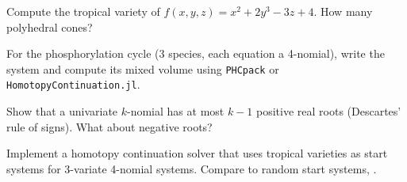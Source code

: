 \label{sec:few:exercises}

\begin{exercise}
Compute the tropical variety of $f(x,y,z) = x^2 + 2y^3 - 3z + 4$. How many polyhedral cones? \cite{rojas2025fewnomial}
\end{exercise}

\begin{exercise}
For the phosphorylation cycle (3 species, each equation a 4-nomial), write the system and compute its mixed volume using \texttt{PHCpack} or \texttt{HomotopyContinuation.jl}.
\end{exercise}

\begin{exercise}
Show that a univariate $k$-nomial has at most $k-1$ positive real roots (Descartes' rule of signs). What about negative roots?
\end{exercise}

\begin{exercise}[Research]
Implement a homotopy continuation solver that uses tropical varieties as start systems for 3-variate 4-nomial systems. Compare to random start systems, \cite{rojas2025fewnomial}.
\end{exercise}